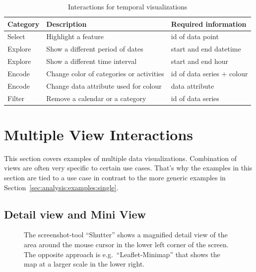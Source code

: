 
\begin{table}
  \begin{tabular*}{\textwidth}{lll}
    \bf Category & \bf Description & \bf Required information \\
    \hline
    Select & Highlight a feature & id of data point \\
    Explore & Show a different period of dates & start and end datetime \\
    Explore & Show a different time interval & start and end hour\\
    Encode & Change color of categories or activities & id of data series + colour \\
    Encode & Change data attribute used for colour & data attribute \\
    Filter & Remove a calendar or a category & id of data series \\
  \end{tabular*}
  \caption{Interactions for temporal visualizations}%
  \label{fig:analysis:temporal:interactions}
\end{table}

\section{Multiple View Interactions}\label{sec:analysis:examples:multiple}

This section covers examples of multiple data visualizations.
Combination of views are often very specific to certain use cases.
That's why the examples in this section are tied to a use case in contrast to the more generic examples in Section~\ref{sec:analysis:examples:single}.


\subsection{Detail view and Mini View}
\begin{figure}
  \centering
    \qquad
  \caption{
    The screenshot-tool ``Shutter'' shows a magnified detail view of the area around the mouse cursor in the lower left corner of the screen.
  The opposite approach is e.g.\ ``Leaflet-Minimap'' that shows the map at a larger scale in the lower right.
  }
  \label{fig:analysis:detail}
\end{figure}


